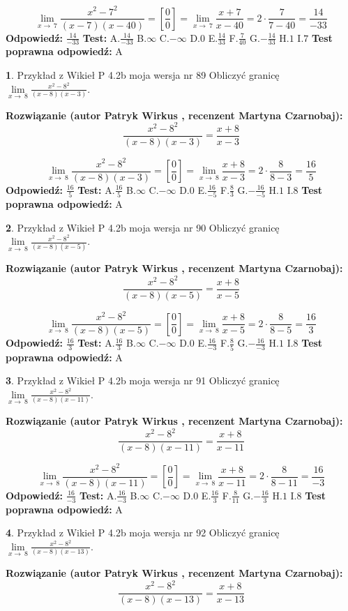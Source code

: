 \documentclass[12pt, a4paper]{article}
\theoremstyle{definition} %
\newtheorem{zad}{}
\newcommand{\zadStart}[1]{\begin{zad}#1\newline}
\newcommand{\zadStop}{\end{zad}}
\newcommand{\rozwStart}[2]{\noindent \textbf{Rozwiązanie (autor #1 , recenzent #2): }\newline}
\newcommand{\rozwStop}{\newline}
\newcommand{\odpStart}{\noindent \textbf{Odpowiedź:}\newline}
\newcommand{\odpStop}{\newline}
\newcommand{\testStart}{\noindent \textbf{Test:}\newline}
\newcommand{\testStop}{\newline}
\newcommand{\kluczStart}{\noindent \textbf{Test poprawna odpowiedź:}\newline}
\newcommand{\kluczStop}{\newline}
\begin{document}
$$\lim\limits_{x\to\ 7}\frac{x^{2}-7^{2}}{(x-7)(x-40)}=[\frac{0}{0}]=\lim\limits_{x\to\ 7}\frac{x+7}{x-40}=2 \cdot \frac{7}{7-40} = \frac{14}{-33}$$
\rozwStop
\odpStart
$\frac{14}{-33}$
\odpStop
\testStart
A.$\frac{14}{-33}$
B.$\infty$
C.$-\infty$
D.$0$
E.$\frac{14}{33}$
F.$\frac{7}{40}$
G.$-\frac{14}{33}$
H.$1$
I.$7$
\testStop
\kluczStart
A
\kluczStop



\zadStart{Przykład z Wikieł P 4.2b moja wersja nr 89}
Obliczyć granicę $\lim\limits_{x\to\ 8}\frac{x^{2}-8^{2}}{(x-8)(x-3)}$.
\zadStop
\rozwStart{Patryk Wirkus}{Martyna Czarnobaj}
$$\frac{x^{2}-8^{2}}{(x-8)(x-3)}=\frac{x+8}{x-3}$$

$$\lim\limits_{x\to\ 8}\frac{x^{2}-8^{2}}{(x-8)(x-3)}=[\frac{0}{0}]=\lim\limits_{x\to\ 8}\frac{x+8}{x-3}=2 \cdot \frac{8}{8-3} = \frac{16}{5}$$
\rozwStop
\odpStart
$\frac{16}{5}$
\odpStop
\testStart
A.$\frac{16}{5}$
B.$\infty$
C.$-\infty$
D.$0$
E.$\frac{16}{-5}$
F.$\frac{8}{3}$
G.$-\frac{16}{-5}$
H.$1$
I.$8$
\testStop
\kluczStart
A
\kluczStop



\zadStart{Przykład z Wikieł P 4.2b moja wersja nr 90}
Obliczyć granicę $\lim\limits_{x\to\ 8}\frac{x^{2}-8^{2}}{(x-8)(x-5)}$.
\zadStop
\rozwStart{Patryk Wirkus}{Martyna Czarnobaj}
$$\frac{x^{2}-8^{2}}{(x-8)(x-5)}=\frac{x+8}{x-5}$$

$$\lim\limits_{x\to\ 8}\frac{x^{2}-8^{2}}{(x-8)(x-5)}=[\frac{0}{0}]=\lim\limits_{x\to\ 8}\frac{x+8}{x-5}=2 \cdot \frac{8}{8-5} = \frac{16}{3}$$
\rozwStop
\odpStart
$\frac{16}{3}$
\odpStop
\testStart
A.$\frac{16}{3}$
B.$\infty$
C.$-\infty$
D.$0$
E.$\frac{16}{-3}$
F.$\frac{8}{5}$
G.$-\frac{16}{-3}$
H.$1$
I.$8$
\testStop
\kluczStart
A
\kluczStop



\zadStart{Przykład z Wikieł P 4.2b moja wersja nr 91}
Obliczyć granicę $\lim\limits_{x\to\ 8}\frac{x^{2}-8^{2}}{(x-8)(x-11)}$.
\zadStop
\rozwStart{Patryk Wirkus}{Martyna Czarnobaj}
$$\frac{x^{2}-8^{2}}{(x-8)(x-11)}=\frac{x+8}{x-11}$$

$$\lim\limits_{x\to\ 8}\frac{x^{2}-8^{2}}{(x-8)(x-11)}=[\frac{0}{0}]=\lim\limits_{x\to\ 8}\frac{x+8}{x-11}=2 \cdot \frac{8}{8-11} = \frac{16}{-3}$$
\rozwStop
\odpStart
$\frac{16}{-3}$
\odpStop
\testStart
A.$\frac{16}{-3}$
B.$\infty$
C.$-\infty$
D.$0$
E.$\frac{16}{3}$
F.$\frac{8}{11}$
G.$-\frac{16}{3}$
H.$1$
I.$8$
\testStop
\kluczStart
A
\kluczStop



\zadStart{Przykład z Wikieł P 4.2b moja wersja nr 92}
Obliczyć granicę $\lim\limits_{x\to\ 8}\frac{x^{2}-8^{2}}{(x-8)(x-13)}$.
\zadStop
\rozwStart{Patryk Wirkus}{Martyna Czarnobaj}
$$\frac{x^{2}-8^{2}}{(x-8)(x-13)}=\frac{x+8}{x-13}$$
\end{document}
